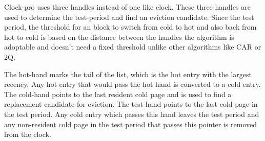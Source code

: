 \documentclass[
	12pt,
	a4paper,
	abstract,
	bibliography=totoc,
	chapterprefix,
	headings=openright,
	numbers=endperiod,
	parskip=half,
	twoside,
]{scrreprt}
\begin{document}
Clock-pro uses three handles instead of one like clock.
These three handles are used to determine the test-period and find an eviction candidate.
Since the test period, the threshold for an block to switch from cold to hot and also back from hot to cold is based on the distance between the handles the algorithm is adoptable and doesn't need a fixed threshold unlike other algorithms like CAR or 2Q.


The hot-hand marks the tail of the list, which is the hot entry with the largest recency.
Any hot entry that would pass the hot hand is converted to a cold entry.
The cold-hand points to the last resident cold page and is used to find a replacement candidate for eviction.
The test-hand points to the last cold page in the test period. Any cold entry which passes this hand leaves the test period and any non-resident cold page in the test period that passes this pointer is removed from the clock.
\end{document}
